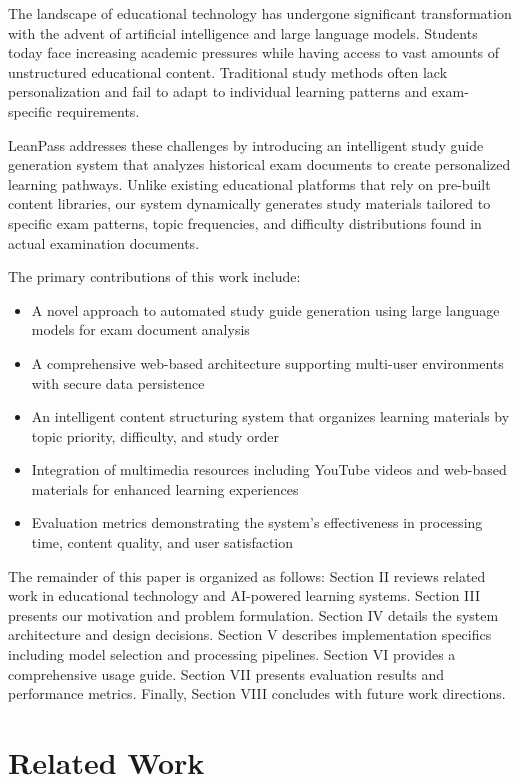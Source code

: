 \documentclass[conference]{IEEEtran}
\begin{document}
The landscape of educational technology has undergone significant transformation with the advent of artificial intelligence and large language models. Students today face increasing academic pressures while having access to vast amounts of unstructured educational content. Traditional study methods often lack personalization and fail to adapt to individual learning patterns and exam-specific requirements.

LeanPass addresses these challenges by introducing an intelligent study guide generation system that analyzes historical exam documents to create personalized learning pathways. Unlike existing educational platforms that rely on pre-built content libraries, our system dynamically generates study materials tailored to specific exam patterns, topic frequencies, and difficulty distributions found in actual examination documents.

The primary contributions of this work include:

\begin{itemize}
\item A novel approach to automated study guide generation using large language models for exam document analysis
\item A comprehensive web-based architecture supporting multi-user environments with secure data persistence
\item An intelligent content structuring system that organizes learning materials by topic priority, difficulty, and study order
\item Integration of multimedia resources including YouTube videos and web-based materials for enhanced learning experiences
\item Evaluation metrics demonstrating the system's effectiveness in processing time, content quality, and user satisfaction
\end{itemize}

The remainder of this paper is organized as follows: Section II reviews related work in educational technology and AI-powered learning systems. Section III presents our motivation and problem formulation. Section IV details the system architecture and design decisions. Section V describes implementation specifics including model selection and processing pipelines. Section VI provides a comprehensive usage guide. Section VII presents evaluation results and performance metrics. Finally, Section VIII concludes with future work directions.

\section{Related Work}
\end{document}
